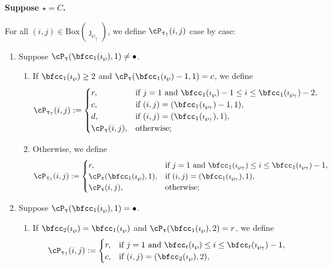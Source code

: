 \documentclass[12pt,a4paper]{amsart}
\def\wpu{\wp_{\uparrow}}
\def\wpd{\wp} %
\def\uptauu{\uptau_{\uparrow}}
\def\uptaud{\uptau} %
\numberwithin{equation}{section}
\theoremstyle{remark}
\newcommand{\BOX}[1]{\mathrm{Box}(#1)}
\begin{document}
 {\bfseries Suppose $\star = C$.}

 \newcommand{\localtextbulletone}{\textcolor{black}{\raisebox{.45ex}{\rule{.6ex}{.6ex}}}}

  For all $(i,j)\in \BOX{\jmath_{\wpu}}$, we define $\cP_{\uptauu}(i,j)$ case by
  case:
 \begin{enumerate}[label=(\alph*)]
   \item Suppose
   $\cP_{\uptaud}(\bfcc_{1}(\imath_{\wpd}),1)\neq \bullet$.
   \begin{enumerate}[label={\localtextbulletone}]
     \item If $\bfcc_{1}(\imath_{\wpd})\geq 2$ and
     $\cP_{\uptau}(\bfcc_{1}(\imath_{\wpd})-1,1) = c$,
     we define
     \[
       \cP_{\uptauu}(i,j) := \begin{cases}
         r ,& \text{if $j=1$ and $\bfcc_{1}(\imath_{\wpd})-1
           \leq i \leq \bfcc_{1}(\imath_{\wpu})-2$},\\
         c ,& \text{if $(i,j)=(\bfcc_{1}(\imath_{\wpu})-1,1)$},\\
         d ,& \text{if $(i,j)=(\bfcc_{1}(\imath_{\wpu}),1)$},\\
         \cP_{\uptaud}(i,j) ,&\text{otherwise};
       \end{cases}
     \]
     \item Otherwise, we define
     \[
       \cP_{\uptauu}(i,j) := \begin{cases}
         r ,& \text{if $j=1$ and $\bfcc_{1}(\imath_{\wpu})
           \leq i \leq \bfcc_{1}(\imath_{\wpu})-1$},\\
         \cP_{\uptaud}(\bfcc_{1}(\imath_{\wpd}),1) ,&
         \text{if $(i,j)=(\bfcc_{1}(\imath_{\wpu}),1)$},\\
         \cP_{\uptaud}(i,j) ,&\text{otherwise};
       \end{cases}
     \]
   \end{enumerate}
   \item Suppose $\cP_{\uptaud}(\bfcc_{1}(\imath_{\wpd}),1)=\bullet$.
   \begin{enumerate}[label={\localtextbulletone}]
     \item If $\bfcc_{2}(\imath_{\wpd}) = \bfcc_{1}(\imath_{\wpd})$
     and
     $\cP_{\uptaud}(\bfcc_{1}(\imath_{\wpd}),2) = r$,
     we define
     \[
       \cP_{\uptauu}(i,j) := \begin{cases}
         r ,& \text{if $j=1$ and $\bfcc_{t}(\imath_{\wpd})\leq i \leq \bfcc_{t}(\imath_{\wpu})-1$},\\
         c ,& \text{if $(i,j)=(\bfcc_{2}(\imath_{\wpd}),2)$},\\

\end{cases}\]
\end{enumerate}
\end{enumerate}
\end{document}
